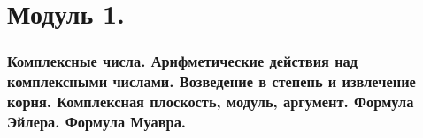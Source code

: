 \Hide

\part{Модуль 1.}

\section{
    Комплексные числа. Арифметические действия над комплексными числами. Возведение в степень и извлечение корня. Комплексная плоскость, модуль, аргумент. Формула Эйлера. Формула Муавра.
}




\newpage








\newpage



